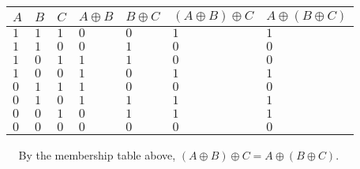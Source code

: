 \documentclass[11pt]{article}
\begin{document}
\begin{tabular}{|l|l|l|l|l|l|l|}
    \hline
    $A$&$B$ &$C$ & $A \oplus B$ &$B \oplus C$ &$(A \oplus B) \oplus C$ &$A \oplus (B \oplus C)$ \\
    \hline
    $1$ & $1$ & $1$ & $0$ & $0$ & $1$ & $1$ \\
    \hline
    $1$ & $1$ & $0$ & $0$ & $1$ & $0$ & $0$ \\
    \hline
    $1$ & $0$ & $1$ & $1$ & $1$ & $0$ & $0$ \\
    \hline
    $1$ & $0$ & $0$ & $1$ & $0$ & $1$ & $1$ \\
    \hline
    $0$ & $1$ & $1$ & $1$ & $0$ & $0$ & $0$ \\
    \hline
    $0$ & $1$ & $0$ & $1$ & $1$ & $1$ & $1$ \\
    \hline
    $0$ & $0$ & $1$ & $0$ & $1$ & $1$ & $1$ \\
    \hline
    $0$ & $0$ & $0$ & $0$ & $0$ & $0$ & $0$ \\
    \hline
\end{tabular}
\begin{flushleft}
    $\>\>\>\>\>$By the membership table above, $(A \oplus B) \oplus C = A \oplus (B \oplus C)$.
\end{flushleft}
\end{document}
